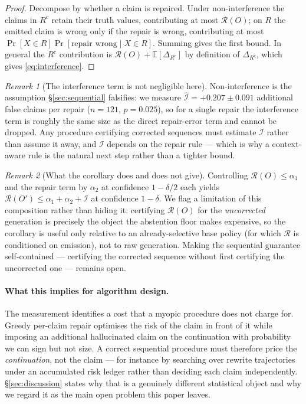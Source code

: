 \documentclass{article}
\theoremstyle{plain}
\theoremstyle{definition}
\theoremstyle{remark}
\newtheorem{remark}{Remark}
\newcommand{\Risk}{\mathcal{R}}
\newcommand{\E}{\mathbb{E}}
\newcommand{\Iota}{\mathcal{I}}
\begin{document}
\begin{proof}
Decompose by whether a claim is repaired. Under non-interference the claims in $R^c$ retain
their truth values, contributing at most $\Risk(O)$; on $R$ the emitted claim is wrong only
if the repair is wrong, contributing at most
$\Pr[X\in R]\Pr[\text{repair wrong}\mid X\in R]$. Summing gives the first bound. In general
the $R^c$ contribution is $\Risk(O)+\E[\Delta_{R^c}]$ by definition of $\Delta_{R^c}$, which
gives \eqref{eq:interference}.
\end{proof}

\begin{remark}[The interference term is not negligible here]
\label{rem:interference}
Non-interference is the assumption \S\ref{sec:sequential} falsifies: we measure
$\widehat{\Iota}=+0.207\pm0.091$ additional false claims per repair ($n=121$, $p=0.025$), so
for a single repair the interference term is roughly the same size as the direct repair-error
term and cannot be dropped. Any procedure certifying corrected sequences must estimate
$\Iota$ rather than assume it away, and $\Iota$ depends on the repair rule --- which is why
a context-aware rule is the natural next step rather than a tighter bound.
\end{remark}

\begin{remark}[What the corollary does and does not give]
\label{rem:corollary}
Controlling $\Risk(O)\le\alpha_1$ and the repair term by $\alpha_2$ at confidence
$1-\delta/2$ each yields $\Risk(O')\le\alpha_1+\alpha_2+\Iota$ at confidence $1-\delta$. We
flag a limitation of this composition rather than hiding it: certifying $\Risk(O)$ for the
\emph{uncorrected} generation is precisely the object the abstention floor makes expensive,
so the corollary is useful only relative to an already-selective base policy (for which
$\Risk$ is conditioned on emission), not to raw generation. Making the sequential guarantee
self-contained --- certifying the corrected sequence without first certifying the
uncorrected one --- remains open.
\end{remark}

\paragraph{What this implies for algorithm design.}
The measurement identifies a cost that a myopic procedure does not charge for. Greedy per-claim
repair optimises the risk of the claim in front of it while imposing an additional hallucinated
claim on the continuation with probability we can sign but not size. A correct sequential
procedure must therefore price the \emph{continuation}, not the claim --- for instance by
searching over rewrite trajectories under an accumulated risk ledger rather than deciding each
claim independently. \S\ref{sec:discussion} states why that is a genuinely different statistical
object and why we regard it as the main open problem this paper leaves.
\end{document}
